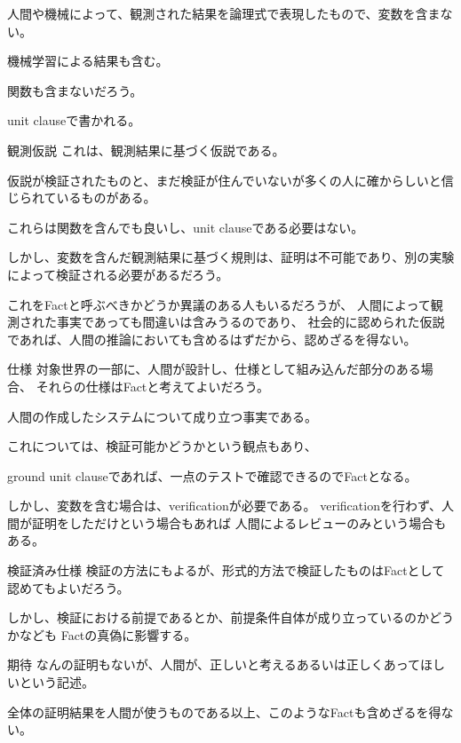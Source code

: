 \documentclass[10pt, onecolumn]{jarticle}   	%
\begin{document}
\begin{description}
\item[ 観測結果] 
人間や機械によって、観測された結果を論理式で表現したもので、変数を含まない。

機械学習による結果も含む。

関数も含まないだろう。

unit clauseで書かれる。

\item{観測仮説}
これは、観測結果に基づく仮説である。

仮説が検証されたものと、まだ検証が住んでいないが多くの人に確からしいと信じられているものがある。

これらは関数を含んでも良いし、unit clauseである必要はない。

しかし、変数を含んだ観測結果に基づく規則は、証明は不可能であり、別の実験によって検証される必要があるだろう。

これをFactと呼ぶべきかどうか異議のある人もいるだろうが、
人間によって観測された事実であっても間違いは含みうるのであり、
社会的に認められた仮説であれば、人間の推論においても含めるはずだから、認めざるを得ない。

\item{仕様}
対象世界の一部に、人間が設計し、仕様として組み込んだ部分のある場合、
それらの仕様はFactと考えてよいだろう。

人間の作成したシステムについて成り立つ事実である。

これについては、検証可能かどうかという観点もあり、

ground unit clauseであれば、一点のテストで確認できるのでFactとなる。

しかし、変数を含む場合は、verificationが必要である。
verificationを行わず、人間が証明をしただけという場合もあれば
人間によるレビューのみという場合もある。

\item{検証済み仕様}
検証の方法にもよるが、形式的方法で検証したものはFactとして認めてもよいだろう。

しかし、検証における前提であるとか、前提条件自体が成り立っているのかどうかなども
Factの真偽に影響する。

\item{期待}
なんの証明もないが、人間が、正しいと考えるあるいは正しくあってほしいという記述。

全体の証明結果を人間が使うものである以上、このようなFactも含めざるを得ない。

\end{description}
\end{document}
